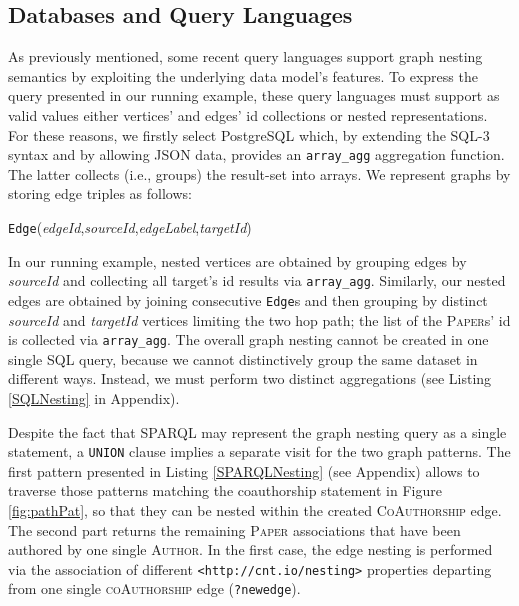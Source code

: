 \subsection{Databases and Query Languages}\label{subsec:pathsumm}
As previously mentioned, some recent  query languages support graph nesting semantics by exploiting the underlying data model's features. To express the query presented in our running example, these query languages must support as valid values  either vertices' and edges' id collections or nested representations.
For these reasons, we firstly select PostgreSQL which, by extending the SQL-3 syntax and by allowing JSON data, provides an \texttt{array\_agg} aggregation function. The latter collects (i.e., groups) the result-set into arrays.  We  represent  graphs by  storing edge triples as follows:
\begin{center}
 \texttt{Edge}(\textit{edgeId},\;\textit{sourceId},\;\textit{edgeLabel},\;\textit{targetId})
\end{center}
In our running example, nested vertices  are obtained by 
grouping edges by \textit{sourceId} and collecting all target's id results via \texttt{array\_agg}. Similarly, our nested edges are obtained by joining consecutive \texttt{Edge}s and then grouping  by  distinct \textit{sourceId} and \textit{targetId}  vertices limiting the two hop path; the list of the \textsc{Paper}s' id is collected via \texttt{array\_agg}. The overall graph nesting cannot be created in one single SQL query, because we cannot distinctively group the same dataset in different ways. Instead, we must perform two distinct aggregations (see Listing \ref{SQLNesting} in Appendix).


Despite the fact that SPARQL  may represent the graph nesting query as a single statement, a \texttt{UNION} clause implies a separate visit for the two graph patterns. The first pattern presented in Listing \ref{SPARQLNesting} (see Appendix) allows to traverse those  patterns matching the coauthorship statement in Figure \ref{fig:pathPat}, so that they can be nested within the created \textsc{CoAuthorship} edge. The second part returns the remaining \textsc{Paper} associations that have been authored by one single \textsc{Author}. In the first case, the edge nesting is performed via the association of different \texttt{<http://cnt.io/nesting>} properties departing from one single  \textsc{coAuthorship} edge (\texttt{?newedge}).

